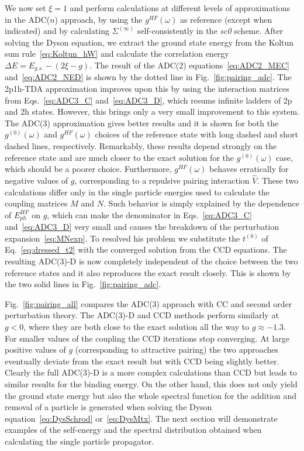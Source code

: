 We now set $\xi=1$ and  perform calculations at different levels of approximations in the ADC($n$) approach, by using the $g^{HF}(\omega)$ as reference (except when indicated)  and by calculating $\Sigma^{(\infty)}$ self-consistently in the {\em sc0} scheme.  After solving the Dyson equation, we extract the ground state energy from the Koltun sum rule~\eqref{eq:Koltun_hW}  and calculate the correlation energy $\Delta E=E_{g.s.} - (2\xi - g)$. 
%
 The result of the ADC(2) equations~\eqref{eq:ADC2_MEC} and~\eqref{eq:ADC2_NED}  is shown by the dotted line in Fig.~\ref{fig:pairing_adc}. 
 The 2p1h-TDA approximation improves upon this by  using  the interaction matrices from Eqs.~\eqref{eq:ADC3_C} and~\eqref{eq:ADC3_D},
 which resums infinite ladders of 2p and 2h states. However, this brings only a very small improvement to this system.
The ADC(3) approximation gives better results and it is shown for  both the $g^{(0)}(\omega)$ and $g^{HF}(\omega)$ choices of the reference state  with long dashed and short dashed lines, respectively.  Remarkably,  these results depend strongly on the reference state and  are much closer to the exact solution for the $g^{(0)}(\omega)$ case, which should be a poorer choice. Furthermore, $g^{HF}(\omega)$ behaves erratically for negative values of $g$, corresponding to a  repulsive pairing interaction $\widehat{V}$.  These two calculations differ only in the single particle energies used to calculate the 
coupling matrices $M$ and $N$. Such behavior is simply explained by the dependence of $E^{HF}_{ph}$ on $g$, which can make the denominator in Eqs.~\eqref{eq:ADC3_C} and~\eqref{eq:ADC3_D}  very small and causes the breakdown of the perturbation expansion~\eqref{eq:MNexp}.
%
To resolved his problem we substitute the $t^{(0)}$ of Eq.~\eqref{eq:dressed_t2} with the converged solution from the CCD equations. The resulting ADC(3)-D is now completely independent of the choice between the two reference states and it also reproduces the exact result closely. This is shown by the two solid lines in Fig.~\ref{fig:pairing_adc}.


Fig.~\ref{fig:pairing_all}  compares the ADC(3) approach with  CC  and second order perturbation theory.  
The ADC(3)-D and CCD methods perform similarly at $g<0$, where they are both close to the exact solution all the way to $g\approx-1.3$. For smaller values of the coupling the CCD iterations stop converging. At large positive values of $g$ (corresponding to attractive pairing) the two approaches eventually deviate from the exact result but with CCD being slightly better. 
%
Clearly the full ADC(3)-D is a more complex calculations than CCD but leads to  similar results for the binding energy. On the other hand, this does not only yield the ground state energy but also the whole spectral function for the addition and removal of a particle is generated when solving the Dyson equation~\eqref{eq:DysSchrod} or~\eqref{eq:DysMtx}.  The next section will demonstrate examples of the self-energy and the spectral distribution obtained when calculating the single particle propagator.


